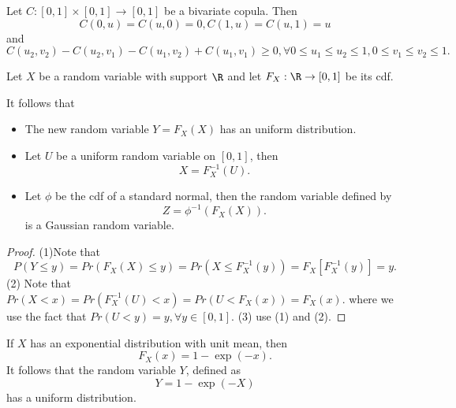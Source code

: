 \begin{refsection}
\begin{corollary}
	Let $C:[0,1]\times[0,1]\to [0,1]$ be a bivariate copula. Then
	$$C(0,u) = C(u,0) = 0, C(1,u) = C(u,1) = u$$
	and
	$$C(u_2,v_2) - C(u_2,v_1) - C(u_1,v_2) + C(u_1,v_1)\geq 0,\forall 0\leq u_1\leq u_2 \leq 1, 0\leq v_1\leq v_2\leq 1.$$
\end{corollary}

\begin{lemma}\label{ch:statistical-models:th:probabilityintegraltransform}
Let $X$ be a random variable with support $\R$ and let $F_X: \R\to [0,1]$ be its cdf. 

It follows that
\begin{itemize}
	\item The new random variable $Y = F_X(X)$ has an uniform distribution.
	\item Let $U$ be a uniform random variable on $[0,1]$, then
	$$X = F^{-1}_X(U).$$   
	\item Let $\phi$ be the cdf of a standard normal, then the random variable defined by
	$$Z = \phi^{-1}(F_X(X)).$$
	is a Gaussian random variable.
\end{itemize} 
\end{lemma}
\begin{proof}
(1)Note that
$$P(Y\leq y) = Pr(F_X(X) \leq y) = Pr(X \leq F_X^{-1}(y)) = F_X[F_X^{-1}(y)] = y.$$
(2) Note that
$Pr(X < x) = Pr(F^{-1}_X(U) < x) = Pr(U < F_X(x)) = F_X(x).$
where we use the fact that $Pr(U < y) = y, \forall y\in [0,1]$.
(3) use (1) and (2).
\end{proof}




\begin{example}
If $X$ has an exponential distribution with unit mean, then 
$$F_X(x) = 1 - \exp(-x).$$
It follows that the random variable $Y$, defined as
$$Y = 1 - \exp(-X)$$
has a uniform distribution.
\end{example}



\end{refsection}
